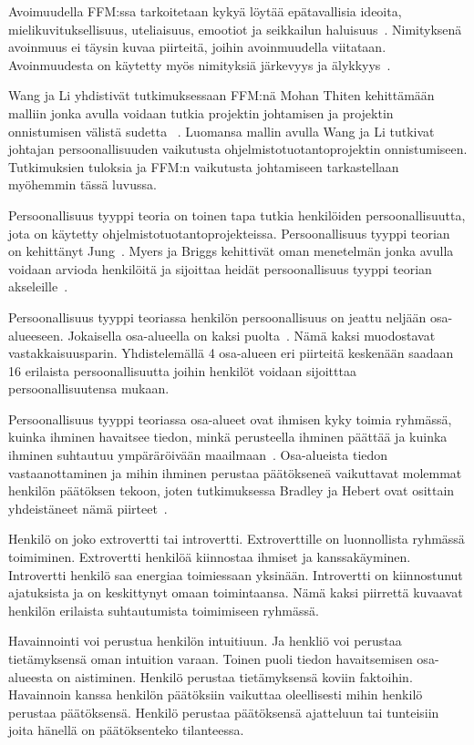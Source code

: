 \documentclass[finnish]{tktltiki2}
\theoremstyle{definition}
\theoremstyle{remark}
\begin{document}
Avoimuudella FFM:ssa tarkoitetaan kykyä löytää epätavallisia ideoita, mielikuvituksellisuus, uteliaisuus, emootiot ja seikkailun haluisuus~\cite{Wang:2009:PMP:1639950.1640049}. Nimityksenä avoinmuus ei täysin kuvaa piirteitä, joihin avoinmuudella viitataan. Avoinmuudesta on käytetty myös nimityksiä järkevyys ja älykkyys~\cite{digman1990personality}. 

Wang ja Li yhdistivät tutkimuksessaan FFM:nä Mohan Thiten kehittämään malliin jonka avulla voidaan tutkia projektin johtamisen ja projektin onnistumisen välistä sudetta ~\cite{Wang:2009:PMP:1639950.1640049}. Luomansa mallin avulla Wang ja Li tutkivat johtajan persoonallisuuden vaikutusta ohjelmistotuotantoprojektin onnistumiseen. Tutkimuksien tuloksia ja FFM:n vaikutusta johtamiseen tarkastellaan myöhemmin tässä luvussa.

Persoonallisuus tyyppi teoria on toinen tapa tutkia henkilöiden persoonallisuutta, jota on käytetty ohjelmistotuotantoprojekteissa. Persoonallisuus tyyppi teorian on kehittänyt Jung~\cite{jung1989psychological}. Myers ja Briggs kehittivät oman menetelmän jonka avulla voidaan arvioda henkilöitä ja sijoittaa heidät persoonallisuus tyyppi teorian akseleille~\cite{myers1985manual}. 

Persoonallisuus tyyppi teoriassa henkilön persoonallisuus on jeattu neljään osa-alueeseen. Jokaisella osa-alueella on kaksi puolta~\cite{bradley1997effect}. Nämä kaksi muodostavat vastakkaisuusparin. Yhdistelemällä 4 osa-alueen eri piirteitä keskenään saadaan 16 erilaista persoonallisuutta joihin henkilöt voidaan sijoitttaa persoonallisuutensa mukaan.

Persoonallisuus tyyppi teoriassa osa-alueet ovat ihmisen kyky toimia ryhmässä, kuinka ihminen havaitsee tiedon, minkä perusteella ihminen päättää ja kuinka ihminen suhtautuu ympäräröivään maailmaan~\cite{bradley1997effect}. Osa-alueista tiedon vastaanottaminen ja mihin ihminen perustaa päätökseneä vaikuttavat molemmat henkilön päätöksen tekoon, joten tutkimuksessa Bradley ja Hebert ovat osittain yhdeistäneet nämä piirteet~\cite{bradley1997effect}. 
   
Henkilö on joko extrovertti tai introvertti. Extroverttille on luonnollista ryhmässä toimiminen. Extrovertti henkilöä kiinnostaa ihmiset ja kanssakäyminen. Introvertti henkilö saa energiaa toimiessaan yksinään. Introvertti on kiinnostunut ajatuksista ja on keskittynyt omaan toimintaansa. Nämä kaksi piirrettä kuvaavat henkilön erilaista suhtautumista toimimiseen ryhmässä.

Havainnointi voi perustua henkilön intuitiuun. Ja henkliö voi perustaa tietämyksensä oman intuition varaan. Toinen puoli tiedon havaitsemisen osa-alueesta on aistiminen. Henkilö perustaa tietämyksensä koviin faktoihin. Havainnoin kanssa henkilön päätöksiin vaikuttaa oleellisesti mihin henkilö perustaa päätöksensä. Henkilö perustaa päätöksensä ajatteluun tai tunteisiin joita hänellä on päätöksenteko tilanteessa.
\end{document}
